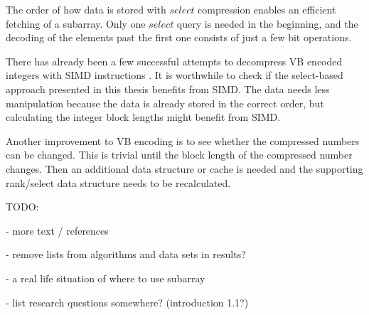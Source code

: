 The order of how data is stored with $select$ compression enables an efficient fetching of a subarray. Only one $select$ query is needed in the beginning, and the decoding of the elements past the first one 
consists of just a few bit operations.  


There has already been a few successful attempts to decompress VB encoded integers with SIMD instructions \citep{Lem18,Pla15}. It is worthwhile to check if the select-based approach presented 
in this thesis benefits from SIMD. The data needs less manipulation because the data is already stored in the correct order, but calculating the integer block lengths might benefit from SIMD.

Another improvement to VB encoding is to see whether the compressed numbers can be changed. This is trivial until the block length of the compressed number changes. Then an additional data structure or 
cache is needed and the supporting rank/select data structure needs to be recalculated.

TODO:

 - more text / references

 - remove lists from algorithms and data sets in results? 

 - a real life situation of where to use subarray

 - list research questions somewhere? (introduction 1.1?)



